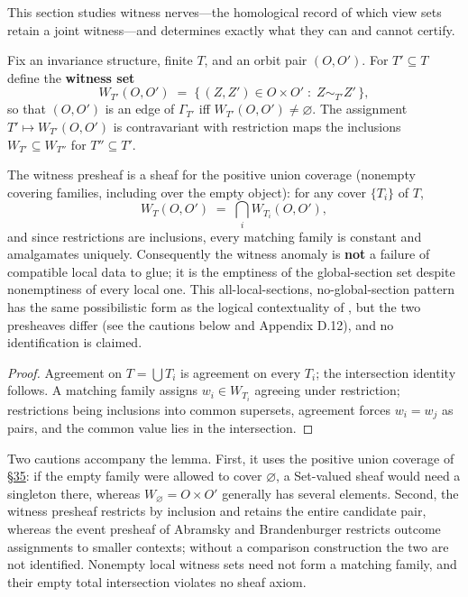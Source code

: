 
This section studies witness nerves---\hspace{0pt}the homological record of which view sets retain a joint witness---\hspace{0pt}and determines exactly what they can and cannot certify.


Fix an invariance structure, finite \(T\), and an orbit pair \((O, O')\). For \(T' \subseteq T\) define the \textbf{witness set}
\[
W_{T'}(O, O') \;=\; \{\, (Z, Z') \in O \times O' \;:\; Z \sim_{T'} Z' \,\},
\]
so that \((O,O')\) is an edge of \(\Gamma_{T'}\) iff \(W_{T'}(O,O') \ne \varnothing\). The assignment \(T' \mapsto W_{T'}(O,O')\) is contravariant with restriction maps the inclusions \(W_{T'} \subseteq W_{T''}\) for \(T'' \subseteq T'\).

\begin{thmplain}

The witness presheaf is a sheaf for the positive union coverage (nonempty covering families, including over the empty object): for any cover \(\{T_i\}\) of \(T\),
\[
W_{T}(O, O') \;=\; \bigcap_i W_{T_i}(O, O'),
\]
and since restrictions are inclusions, every matching family is constant and amalgamates uniquely. Consequently the witness anomaly is \textbf{not} a failure of compatible local data to glue; it is the emptiness of the global-section set despite nonemptiness of every local one. This all-local-sections, no-global-section pattern has the same possibilistic form as the logical contextuality of \autocite{abramsky2011}, but the two presheaves differ (see the cautions below and Appendix D.12), and no identification is claimed.
\end{thmplain}

\begin{proof}

Agreement on \(T = \bigcup T_i\) is agreement on every \(T_i\); the intersection identity follows. A matching family assigns \(w_i \in W_{T_i}\) agreeing under restriction; restrictions being inclusions into common supersets, agreement forces \(w_i = w_j\) as pairs, and the common value lies in the intersection.
\end{proof}

Two cautions accompany the lemma. First, it uses the positive union coverage of \hyperlink{sec:35}{§35}: if the empty family were allowed to cover \(\varnothing\), a Set-valued sheaf would need a singleton there, whereas \(W_\varnothing=O\times O'\) generally has several elements. Second, the witness presheaf restricts by inclusion and retains the entire candidate pair, whereas the event presheaf of Abramsky and Brandenburger restricts outcome assignments to smaller contexts; without a comparison construction the two are not identified. Nonempty local witness sets need not form a matching family, and their empty total intersection violates no sheaf axiom.

